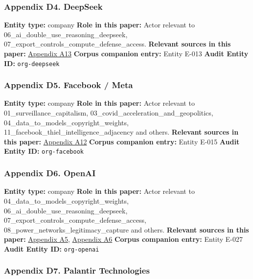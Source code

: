 \documentclass[
  american,
  11pt,
  letterpaper,
]{article}
\begin{document}
\subsubsection{Appendix D4. DeepSeek}\label{appendix-d4-deepseek}

\textbf{Entity type:} company \textbf{Role in this paper:} Actor
relevant to 06\_ai\_double\_use\_reasoning\_deepseek,
07\_export\_controls\_compute\_defense\_access. \textbf{Relevant sources
in this paper:}
\hyperref[appendix-a13-deepseek-r1-incentivizing-reasoning-capability-in-llms-via-reinforcement-learning]{Appendix
A13} \textbf{Corpus companion entry:} Entity E-013 \textbf{Audit Entity
ID:} \texttt{org-deepseek}

\subsubsection{Appendix D5. Facebook /
Meta}\label{appendix-d5-facebook-meta}

\textbf{Entity type:} company \textbf{Role in this paper:} Actor
relevant to 01\_surveillance\_capitalism,
03\_covid\_acceleration\_and\_geopolitics,
04\_data\_to\_models\_copyright\_weights,
11\_facebook\_thiel\_intelligence\_adjacency and others.
\textbf{Relevant sources in this paper:}
\hyperref[appendix-a12-meta-platforms-inc-2022-definitive-proxy-statement]{Appendix
A12} \textbf{Corpus companion entry:} Entity E-015 \textbf{Audit Entity
ID:} \texttt{org-facebook}

\subsubsection{Appendix D6. OpenAI}\label{appendix-d6-openai}

\textbf{Entity type:} company \textbf{Role in this paper:} Actor
relevant to 04\_data\_to\_models\_copyright\_weights,
06\_ai\_double\_use\_reasoning\_deepseek,
07\_export\_controls\_compute\_defense\_access,
08\_power\_networks\_legitimacy\_capture and others. \textbf{Relevant
sources in this paper:}
\hyperref[appendix-a5-openais-proposals-for-the-us-ai-action-plan]{Appendix
A5}, \hyperref[appendix-a6-introducing-openai-for-government]{Appendix
A6} \textbf{Corpus companion entry:} Entity E-027 \textbf{Audit Entity
ID:} \texttt{org-openai}

\subsubsection{Appendix D7. Palantir
Technologies}\label{appendix-d7-palantir-technologies}
\end{document}
